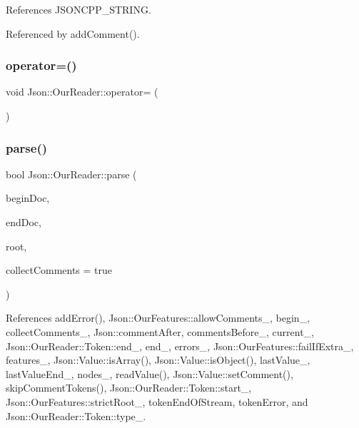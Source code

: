 References J\+S\+O\+N\+C\+P\+P\+\_\+\+S\+T\+R\+I\+NG.



Referenced by add\+Comment().

\mbox{\label{classJson_1_1OurReader_ad418de7c47bd3d0510888e22110b796e_ad418de7c47bd3d0510888e22110b796e}} 
\subsubsection{\texorpdfstring{operator=()}{operator=()}}
{\footnotesize\ttfamily void Json\+::\+Our\+Reader\+::operator= (\begin{DoxyParamCaption}\item[{\hyperlink{classJson_1_1OurReader}{Our\+Reader} const \&}]{ }\end{DoxyParamCaption})\hspace{0.3cm}{\ttfamily [private]}}

\mbox{\label{classJson_1_1OurReader_aba4f8749aab7f02ec17f107e392caf80_aba4f8749aab7f02ec17f107e392caf80}} 
\subsubsection{\texorpdfstring{parse()}{parse()}}
{\footnotesize\ttfamily bool Json\+::\+Our\+Reader\+::parse (\begin{DoxyParamCaption}\item[{const char $\ast$}]{begin\+Doc,  }\item[{const char $\ast$}]{end\+Doc,  }\item[{\hyperlink{classJson_1_1Value}{Value} \&}]{root,  }\item[{bool}]{collect\+Comments = {\ttfamily true} }\end{DoxyParamCaption})}



References add\+Error(), Json\+::\+Our\+Features\+::allow\+Comments\+\_\+, begin\+\_\+, collect\+Comments\+\_\+, Json\+::comment\+After, comments\+Before\+\_\+, current\+\_\+, Json\+::\+Our\+Reader\+::\+Token\+::end\+\_\+, end\+\_\+, errors\+\_\+, Json\+::\+Our\+Features\+::fail\+If\+Extra\+\_\+, features\+\_\+, Json\+::\+Value\+::is\+Array(), Json\+::\+Value\+::is\+Object(), last\+Value\+\_\+, last\+Value\+End\+\_\+, nodes\+\_\+, read\+Value(), Json\+::\+Value\+::set\+Comment(), skip\+Comment\+Tokens(), Json\+::\+Our\+Reader\+::\+Token\+::start\+\_\+, Json\+::\+Our\+Features\+::strict\+Root\+\_\+, token\+End\+Of\+Stream, token\+Error, and Json\+::\+Our\+Reader\+::\+Token\+::type\+\_\+.




